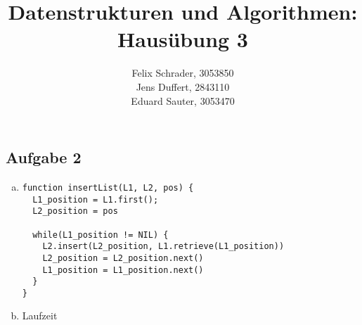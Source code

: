 \documentclass[11pt]{article}
\author{
  Felix Schrader, 3053850 \\ 
  Jens Duffert, 2843110 \\
  Eduard Sauter, 3053470
}
\title{Datenstrukturen und Algorithmen: Haus\"ubung 3}
\begin{document}
\maketitle
\subsection*{Aufgabe 2}
\begin{enumerate}[a)]
  \item  
\begin{center}
\begin{lstlisting}
function insertList(L1, L2, pos) {
  L1_position = L1.first();
  L2_position = pos

  while(L1_position != NIL) {
    L2.insert(L2_position, L1.retrieve(L1_position))
    L2_position = L2_position.next()
    L1_position = L1_position.next()
  }
}
\end{lstlisting}
\end{center}
    
  \item Laufzeit
    
    
\end{enumerate}
\end{document}
